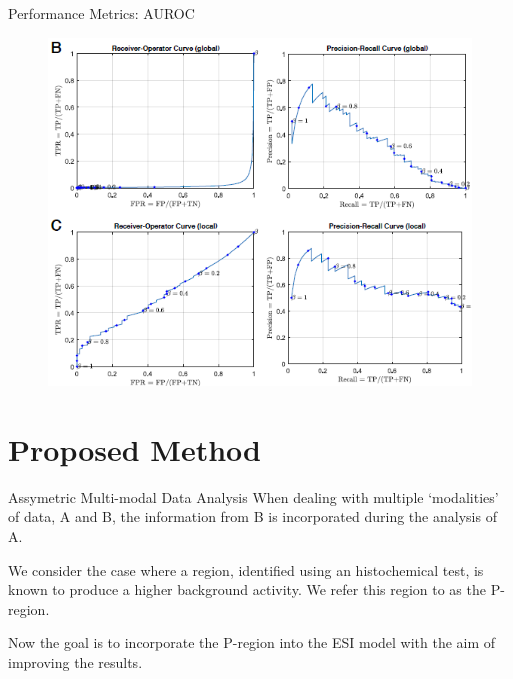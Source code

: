 \documentclass[progressbar=head]{beamer}
\begin{document}
\begin{frame}{Performance Metrics: AUROC}
\begin{figure}
\centering
\includegraphics[width=0.6\linewidth]{./img_dev3/auroc2}
\end{figure}
\end{frame}

{
\section{Proposed Method}
}

\begin{frame}{Assymetric Multi-modal Data Analysis}
When dealing with multiple `modalities' of data, A and B, the information from B is incorporated during the analysis of A.

We consider the case where a region, identified using an histochemical test, is known to produce a higher background activity.
%
We refer this region to as the P-region.

Now the goal is to incorporate the P-region into the ESI model with the aim of improving the results. 
\end{frame}
\end{document}
